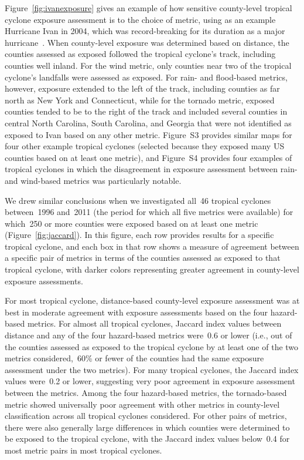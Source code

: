 Figure~\ref{fig:ivanexposure} gives an example of how sensitive county-level
tropical cyclone exposure assessment is to the choice of metric, using as an
example Hurricane Ivan in 2004, which was record-breaking for its duration as a
major hurricane~\parencite{franklin2006atlantic}. When county-level exposure
was determined based on distance, the counties assessed as exposed followed the
tropical cyclone's track, including counties well inland. For the wind metric,
only counties near two of the tropical cyclone's landfalls were assessed as
exposed. For rain- and flood-based metrics, however, exposure extended to the
left of the track, including counties as far north as New York and Connecticut,
while for the tornado metric, exposed counties tended to be to the right of the
track and included several counties in central North Carolina, South Carolina,
and Georgia that were not identified as exposed to Ivan based on any other
metric.  Figure~S3 provides similar maps for four other
example tropical cyclones (selected because they exposed many \ac{US}  counties
based on at least one metric), and Figure~S4 provides four
examples of tropical cyclones in which the disagreement in exposure assessment
between rain- and wind-based metrics was particularly notable.

We drew similar conclusions when we investigated all~46 tropical cyclones
between~1996 and~2011 (the period for which all five metrics were available)
for which~250 or more counties were exposed based on at least one metric
(Figure~\ref{fig:jaccard}). In this figure, each row provides results for a
specific tropical cyclone, and each box in that row shows a measure of
agreement between a specific pair of metrics in terms of the counties assessed
as exposed to that tropical cyclone, with darker colors representing greater
agreement in county-level exposure assessments.  

For most tropical cyclone, distance-based county-level exposure assessment was
at best in moderate agreement with exposure assessments based on the four
hazard-based metrics. For almost all tropical cyclones, Jaccard index values
between distance and any of the four hazard-based metrics were~0.6 or lower
(i.e., out of the counties assessed as exposed to the tropical cyclone by at
least one of the two metrics considered,~60\si{\percent} or fewer of the
counties had the same exposure assessment under the two metrics). For many
tropical cyclones, the Jaccard index values were~0.2 or lower, suggesting very
poor agreement in exposure assessment between the metrics.  Among the four
hazard-based metrics, the tornado-based metric showed universally poor
agreement with other metrics in county-level classification across all tropical
cyclones considered.  For other pairs of metrics, there were also generally
large differences in which counties were determined to be exposed to the
tropical cyclone, with the Jaccard index values below~0.4 for most metric pairs
in most tropical cyclones.

